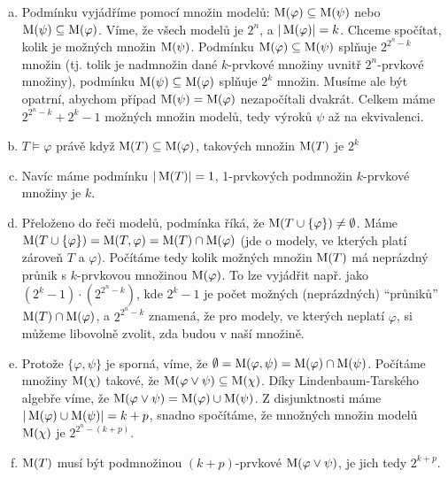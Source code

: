 \begin{problem}
    \begin{solution}
        \begin{enumerate}[(a)]
            \item Podmínku vyjádříme pomocí množin modelů: $\operatorname{M}(\varphi)\subseteq\operatorname{M}(\psi)$ nebo $\operatorname{M}(\psi)\subseteq\operatorname{M}(\varphi)$. Víme, že všech modelů je $2^n$, a $|\operatorname{M}(\varphi)|=k$. Chceme spočítat, kolik je možných množin $\operatorname{M}(\psi)$. Podmínku $\operatorname{M}(\varphi)\subseteq\operatorname{M}(\psi)$ splňuje $2^{2^n-k}$ množin (tj. tolik je nadmnožin dané $k$-prvkové množiny uvnitř $2^n$-prvkové množiny), podmínku $\operatorname{M}(\psi)\subseteq\operatorname{M}(\varphi)$ splňuje $2^k$ množin. Musíme ale být opatrní, abychom případ $\operatorname{M}(\psi)=\operatorname{M}(\varphi)$ nezapočítali dvakrát. Celkem máme $2^{2^n-k}+2^k-1$ možných množin modelů, tedy výroků $\psi$ až na ekvivalenci.
            \item $T\models\varphi$ právě když $\operatorname{M}(T)\subseteq\operatorname{M}(\varphi)$, takových množin $\operatorname{M}(T)$ je $2^k$
            \item Navíc máme podmínku $|\operatorname{M}(T)|=1$, 1-prvkových podmnožin $k$-prvkové množiny je $k$.
            \item Přeloženo do řeči modelů, podmínka říká, že $\operatorname{M}(T\cup\{\varphi\})\neq\emptyset$. Máme $\operatorname{M}(T\cup\{\varphi\})=\operatorname{M}(T,\varphi)=\operatorname{M}(T)\cap\operatorname{M}(\varphi)$ (jde o modely, ve kterých platí zároveň $T$ a $\varphi$). Počítáme tedy kolik možných množin $\operatorname{M}(T)$ má neprázdný průnik s $k$-prvkovou množinou $\operatorname{M}(\varphi)$. To lze vyjádřit např. jako $(2^k-1)\cdot(2^{2^n-k})$, kde $2^k-1$ je počet možných (neprázdných) ``průniků'' $\operatorname{M}(T)\cap\operatorname{M}(\varphi)$, a $2^{2^n-k}$ znamená, že pro modely, ve kterých neplatí $\varphi$, si můžeme libovolně zvolit, zda budou v naší množině.
            \item Protože $\{\varphi,\psi\}$ je sporná, víme, že $\emptyset=\operatorname{M}(\varphi,\psi)=\operatorname{M}(\varphi)\cap\operatorname{M}(\psi)$. Počítáme množiny $\operatorname{M}(\chi)$ takové, že $\operatorname{M}(\varphi\lor\psi)\subseteq\operatorname{M}(\chi)$. Díky Lindenbaum-Tarského algebře víme, že $\operatorname{M}(\varphi\lor\psi)=\operatorname{M}(\varphi)\cup\operatorname{M}(\psi)$. Z disjunktnosti máme $|\operatorname{M}(\varphi)\cup\operatorname{M}(\psi)|=k+p$, snadno spočítáme, že množných množin modelů $\operatorname{M}(\chi)$ je $2^{2^n-(k+p)}$.
            \item $\operatorname{M}(T)$ musí být podmnožinou $(k+p)$-prvkové $\operatorname{M}(\varphi\lor\psi)$, je jich tedy $2^{k+p}$.
        \end{enumerate}
                
    \end{solution}
    
\end{problem}


